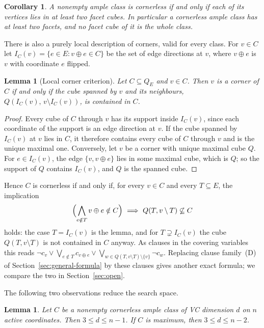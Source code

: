 \documentclass[11pt]{article}
\numberwithin{equation}{section}
\newtheorem{lemma}[theorem]{Lemma}
\newtheorem{corollary}[theorem]{Corollary}
\theoremstyle{definition}
\theoremstyle{remark}
\begin{document}
\begin{corollary}
\label{cor:cornerless-cover}
A nonempty ample class is cornerless if and only if each of its vertices
lies in at least two facet cubes.  In particular a cornerless ample class
has at least two facets, and no facet cube of it is the whole class.
\end{corollary}

There is also a purely local description of corners, valid for every
class.  For \(v\in C\) let \(I_C(v)=\{e\in E: v\oplus e\in C\}\) be the set of
edge directions at \(v\), where \(v\oplus e\) is \(v\) with coordinate \(e\)
flipped.

\begin{lemma}[Local corner criterion]
\label{lem:local-corner}
Let \(C\subseteq Q_E\) and \(v\in C\).  Then \(v\) is a corner of \(C\) if and
only if the cube spanned by \(v\) and its neighbours,
\(Q(I_C(v),\,v\setminus I_C(v))\), is contained in \(C\).
\end{lemma}

\begin{proof}
Every cube of \(C\) through \(v\) has its support inside \(I_C(v)\), since
each coordinate of the support is an edge direction at \(v\).  If the
cube spanned by \(I_C(v)\) at \(v\) lies in \(C\), it therefore contains every
cube of \(C\) through \(v\) and is the unique maximal one.  Conversely, let
\(v\) be a corner with unique maximal cube \(Q\).  For \(e\in I_C(v)\), the
edge \(\{v,v\oplus e\}\) lies in some maximal cube, which is \(Q\); so the
support of \(Q\) contains \(I_C(v)\), and \(Q\) is the spanned cube.
\end{proof}

Hence \(C\) is cornerless if and only if, for every \(v\in C\) and every
\(T\subseteq E\), the implication
\[
 \Bigl(\bigwedge_{e\notin T} v\oplus e\notin C\Bigr)\ \Longrightarrow\
 Q(T,v\setminus T)\not\subseteq C
\]
holds: the case \(T=I_C(v)\) is the lemma, and for \(T\supsetneq I_C(v)\) the
cube \(Q(T,v\setminus T)\) is not contained in \(C\) anyway.  As clauses in the
covering variables this reads
\(\neg c_v\vee\bigvee_{e\notin T}c_{v\oplus e}\vee\bigvee_{w\in
Q(T,v\setminus T)\setminus\{v\}}\neg c_w\).  Replacing clause family~(D)
of Section~\ref{sec:general-formula} by these clauses gives another exact
formula; we compare the two in Section~\ref{sec:open}.

The following two observations reduce the search space.

\begin{lemma}
\label{lem:small-vc}
Let \(C\) be a nonempty cornerless ample class of VC dimension \(d\) on
\(n\) active coordinates.  Then \(3\le d\le n-1\).  If \(C\) is maximum,
then \(3\le d\le n-2\).
\end{lemma}
\end{document}
